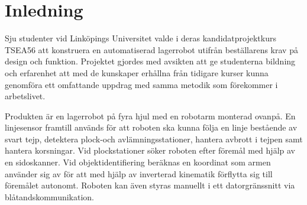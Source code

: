 

\section{Inledning}
Sju studenter vid Linköpings Universitet valde i deras kandidatprojektkurs TSEA56 att konstruera en automatiserad lagerrobot utifrån beställarens krav på design och funktion. Projektet gjordes med avsikten att ge studenterna bildning och erfarenhet att med de kunskaper erhållna från tidigare kurser kunna genomföra ett omfattande uppdrag med samma metodik som förekommer i arbetslivet.

Produkten är en lagerrobot på fyra hjul med en robotarm monterad ovanpå. En linjesensor framtill används för att roboten ska kunna följa en linje bestående av svart tejp, detektera plock-och avlämningsstationer, hantera avbrott i tejpen samt hantera korsningar. Vid plockstationer söker roboten efter föremål med hjälp av en sidoskanner. Vid objektidentifiering beräknas en koordinat som armen använder sig av för att med hjälp av inverterad kinematik förflytta sig till föremålet autonomt. Roboten kan även styras manuellt i ett datorgränssnitt via blåtandskommunikation. 